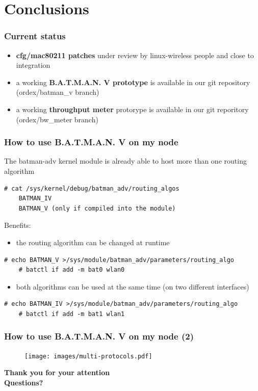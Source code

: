 \documentclass[slidestop]{beamer}
\begin{document}
\section{Conclusions}
\begin{frame}[c]
	\frametitle{Current status}
	\begin{itemize}
		\item \textbf{cfg/mac80211 patches} under review by linux-wireless people
			and close to integration
		\item a working \textbf{B.A.T.M.A.N. V prototype} is available in our git
			repository (ordex/batman\_v branch)
		\item a working \textbf{throughput meter} protorype is available
			in our git reporitory (ordex/bw\_meter branch)
	\end{itemize}
\end{frame}

\begin{frame}[c,fragile]
	\frametitle{How to use B.A.T.M.A.N. V on my node}
	The batman-adv kernel module is already able to host more than one
	routing algorithm
	\begin{lstlisting}[basicstyle=\scriptsize]
	# cat /sys/kernel/debug/batman_adv/routing_algos
	BATMAN_IV
	BATMAN_V (only if compiled into the module)
	\end{lstlisting}
	\pause
	Benefits:
	\begin{itemize}
		\item the routing algorithm can be changed at runtime
	\end{itemize}
	\begin{lstlisting}[basicstyle=\scriptsize]
	# echo BATMAN_V >/sys/module/batman_adv/parameters/routing_algo
	# batctl if add -m bat0 wlan0
	\end{lstlisting}
	\pause
	\begin{itemize}
		\item both algorithms can be used at the same time (on two
			different interfaces)
	\end{itemize}
	\begin{lstlisting}[basicstyle=\scriptsize]
	# echo BATMAN_IV >/sys/module/batman_adv/parameters/routing_algo
	# batctl if add -m bat1 wlan1
	\end{lstlisting}
\end{frame}

\begin{frame}[c]
	\frametitle{How to use B.A.T.M.A.N. V on my node (2)}
	\begin{figure}
		\centering
		\texttt{[image: images/multi-protocols.pdf]}
	\end{figure}
\end{frame}

\begin{frame}[c]
	\begin{center}
	\Large{\textbf{Thank you for your attention\\[1cm]
	Questions?}}
	\end{center}
\end{frame}
\end{document}

